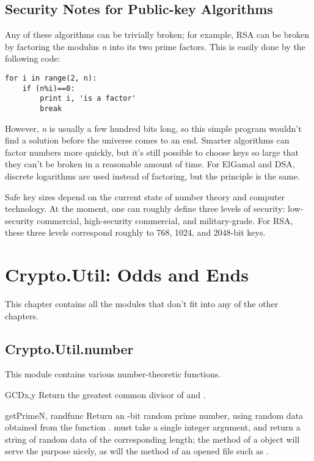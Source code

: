 \documentclass{howto}
\begin{document}
\subsection{Security Notes for Public-key Algorithms}
Any of these algorithms can be trivially broken; for example, RSA can be
broken by factoring the modulus \emph{n} into its two prime factors.
This is easily done by the following code:

\begin{verbatim}
for i in range(2, n): 
    if (n%i)==0: 
        print i, 'is a factor' 
        break
\end{verbatim}

However, \emph{n} is usually a few hundred bits long, so this simple
program wouldn't find a solution before the universe comes to an end.
Smarter algorithms can factor numbers more quickly, but it's still
possible to choose keys so large that they can't be broken in a
reasonable amount of time.  For ElGamal and DSA, discrete logarithms are
used instead of factoring, but the principle is the same.

Safe key sizes depend on the current state of number theory and
computer technology.  At the moment, one can roughly define three
levels of security: low-security commercial, high-security commercial,
and military-grade.  For RSA, these three levels correspond roughly to
768, 1024, and 2048-bit keys.


\section{Crypto.Util: Odds and Ends}
This chapter contains all the modules that don't fit into any of the
other chapters.  

\subsection{Crypto.Util.number}

This module contains various number-theoretic functions.  

\begin{funcdesc}{GCD}{x,y}
Return the greatest common divisor of  and .
\end{funcdesc}

\begin{funcdesc}{getPrime}{N, randfunc}
Return an -bit random prime number, using random data obtained
from the function .   must take a single
integer argument, and return a string of random data of the
corresponding length; the  method of a
 object will serve the purpose nicely, as will the
 method of an opened file such as .
\end{funcdesc}
\end{document}
